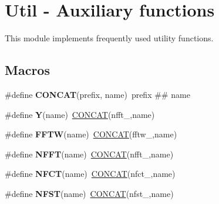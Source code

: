 \hypertarget{group__nfftutil}{\section{Util -\/ Auxiliary functions}
\label{group__nfftutil}
}


This module implements frequently used utility functions.  


\subsection*{Macros}
\begin{DoxyCompactItemize}
\item 
\hypertarget{group__nfftutil_ga1182d58d938007138fc59b18dca63ccb}{\#define {\bfseries C\-O\-N\-C\-A\-T}(prefix, name)~prefix \#\# name}\label{group__nfftutil_ga1182d58d938007138fc59b18dca63ccb}

\item 
\hypertarget{group__nfftutil_ga8b6269f253e2477499c586a966b329b2}{\#define {\bfseries Y}(name)~\hyperlink{solver_8c_a04583350aeb5e936b6fb328093ad4e62}{C\-O\-N\-C\-A\-T}(nfft\-\_\-,name)}\label{group__nfftutil_ga8b6269f253e2477499c586a966b329b2}

\item 
\hypertarget{group__nfftutil_gaa49a8fbc23ef18bfdc436b06d6388d42}{\#define {\bfseries F\-F\-T\-W}(name)~\hyperlink{solver_8c_a04583350aeb5e936b6fb328093ad4e62}{C\-O\-N\-C\-A\-T}(fftw\-\_\-,name)}\label{group__nfftutil_gaa49a8fbc23ef18bfdc436b06d6388d42}

\item 
\hypertarget{group__nfftutil_ga564a9c2be1b3e049c12b0b32593c0c46}{\#define {\bfseries N\-F\-F\-T}(name)~\hyperlink{solver_8c_a04583350aeb5e936b6fb328093ad4e62}{C\-O\-N\-C\-A\-T}(nfft\-\_\-,name)}\label{group__nfftutil_ga564a9c2be1b3e049c12b0b32593c0c46}

\item 
\hypertarget{group__nfftutil_ga3528f9832eb83053a31037130b87efb7}{\#define {\bfseries N\-F\-C\-T}(name)~\hyperlink{solver_8c_a04583350aeb5e936b6fb328093ad4e62}{C\-O\-N\-C\-A\-T}(nfct\-\_\-,name)}\label{group__nfftutil_ga3528f9832eb83053a31037130b87efb7}

\item 
\hypertarget{group__nfftutil_gac8d728256bd91473a1f42b782b6eb752}{\#define {\bfseries N\-F\-S\-T}(name)~\hyperlink{solver_8c_a04583350aeb5e936b6fb328093ad4e62}{C\-O\-N\-C\-A\-T}(nfst\-\_\-,name)}\label{group__nfftutil_gac8d728256bd91473a1f42b782b6eb752}


\end{DoxyCompactItemize}
